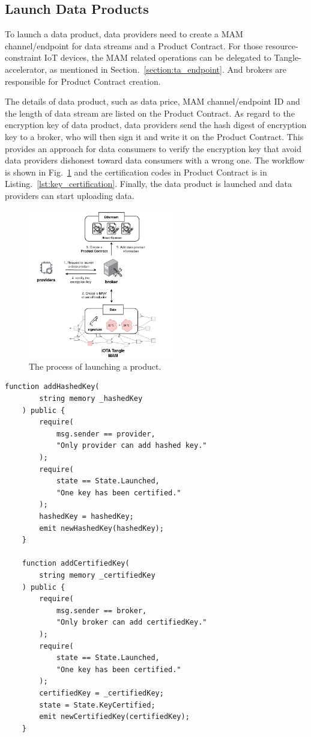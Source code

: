 \documentclass[conference]{IEEEtran}
\begin{document}
\subsection{Launch Data Products}
To launch a data product, data providers need to create a MAM channel/endpoint for data streams and a Product Contract. For those resource-constraint IoT devices, the MAM related operations can be delegated to Tangle-accelerator, as mentioned in Section.~\ref{section:ta_endpoint}. And brokers are responsible for Product Contract creation. 

The details of data product, such as data price, MAM channel/endpoint ID and the length of data stream are listed on the Product Contract. As regard to the encryption key of data product, data providers send the hash digest of encryption key to a broker, who will then sign it and write it on the Product Contract. This provides an approach for data consumers to verify the encryption key that avoid data providers dishonest toward data consumers with a wrong one. The workflow is shown in Fig.~\ref{fig:launching_product} and the certification codes in Product Contract is in Listing.~\ref{lst:key_certification}. Finally, the data product is launched and data providers can start uploading data.
 
\begin{figure}[!t]
    \centering
    \includegraphics[width=2.5in]{launching_product}
    \caption{The process of launching a product.}
    \label{fig:launching_product}
\end{figure}

\begin{lstlisting}[caption={Functions of hased key update and certified key update}, label={lst:key_certification}, frame=single]
    function addHashedKey(
        string memory _hashedKey
    ) public {
        require(
            msg.sender == provider,
            "Only provider can add hashed key."
        );
        require(
            state == State.Launched,
            "One key has been certified."
        );
        hashedKey = hashedKey;
        emit newHashedKey(hashedKey);
    }
    	
    function addCertifiedKey(
        string memory _certifiedKey
    ) public {
        require(
            msg.sender == broker,
            "Only broker can add certifiedKey."
        );
        require(
            state == State.Launched,
            "One key has been certified."
        );
        certifiedKey = _certifiedKey;
        state = State.KeyCertified;
        emit newCertifiedKey(certifiedKey);
    }
\end{lstlisting}
\end{document}
